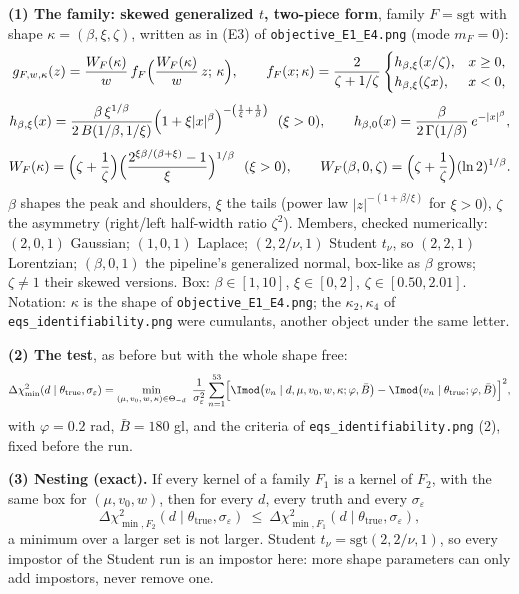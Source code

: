 \textbf{(1) The family: skewed generalized $t$, two-piece form}, family $F=\mathrm{sgt}$ with shape $\kappa=(\beta,\xi,\zeta)$, written as in (E3) of \texttt{objective\_E1\_E4.png} (mode $m_F=0$):
\begin{gather*}
g_{F,w,\kappa}(z)=\frac{W_F(\kappa)}{w}\,f_F\Bigl(\frac{W_F(\kappa)}{w}\,z;\,\kappa\Bigr),\qquad
f_F(x;\kappa)=\frac{2}{\zeta+1/\zeta}\begin{cases}h_{\beta,\xi}(x/\zeta), & x\ge0,\\ h_{\beta,\xi}(\zeta x), & x<0,\end{cases}\\[4pt]
h_{\beta,\xi}(x)=\frac{\beta\,\xi^{1/\beta}}{2\,B(1/\beta,1/\xi)}\Bigl(1+\xi\lvert x\rvert^{\beta}\Bigr)^{-\left(\frac1\xi+\frac1\beta\right)}\ \ (\xi>0),\qquad
h_{\beta,0}(x)=\frac{\beta}{2\,\Gamma(1/\beta)}\,e^{-\lvert x\rvert^{\beta}},\\[4pt]
W_F(\kappa)=\Bigl(\zeta+\frac1\zeta\Bigr)\Bigl(\frac{2^{\xi\beta/(\beta+\xi)}-1}{\xi}\Bigr)^{1/\beta}\ \ (\xi>0),\qquad
W_F(\beta,0,\zeta)=\Bigl(\zeta+\frac1\zeta\Bigr)(\ln2)^{1/\beta}.
\end{gather*}
$\beta$ shapes the peak and shoulders, $\xi$ the tails (power law $\lvert z\rvert^{-(1+\beta/\xi)}$ for $\xi>0$), $\zeta$ the asymmetry (right/left half-width ratio $\zeta^{2}$). Members, checked numerically: $(2,0,1)$ Gaussian; $(1,0,1)$ Laplace; $(2,2/\nu,1)$ Student $t_\nu$, so $(2,2,1)$ Lorentzian; $(\beta,0,1)$ the pipeline's generalized normal, box-like as $\beta$ grows; $\zeta\neq1$ their skewed versions. Box: $\beta\in[1,10]$, $\xi\in[0,2]$, $\zeta\in[0.50,2.01]$. Notation: $\kappa$ is the shape of \texttt{objective\_E1\_E4.png}; the $\kappa_2,\kappa_4$ of \texttt{eqs\_identifiability.png} were cumulants, another object under the same letter.

\medskip
\textbf{(2) The test}, as before but with the whole shape free:
\begin{equation*}
\Delta\chi^2_{\min}(d\mid\theta_{\mathrm{true}},\sigma_\varepsilon)=\min_{(\mu,\,v_0,\,w,\,\kappa)\in\Theta_{-d}}\ \frac{1}{\sigma_\varepsilon^{2}}\sum_{n=1}^{53}\Bigl[\Imod\bigl(v_n\mid d,\mu,v_0,w,\kappa;\varphi,\bar B\bigr)-\Imod\bigl(v_n\mid\theta_{\mathrm{true}};\varphi,\bar B\bigr)\Bigr]^{2},
\end{equation*}
with $\varphi=0.2$ rad, $\bar B=180$ gl, and the criteria of \texttt{eqs\_identifiability.png} (2), fixed before the run.

\medskip
\textbf{(3) Nesting (exact).} If every kernel of a family $F_1$ is a kernel of $F_2$, with the same box for $(\mu,v_0,w)$, then for every $d$, every truth and every $\sigma_\varepsilon$
\begin{equation*}
\Delta\chi^2_{\min,F_2}(d\mid\theta_{\mathrm{true}},\sigma_\varepsilon)\ \le\ \Delta\chi^2_{\min,F_1}(d\mid\theta_{\mathrm{true}},\sigma_\varepsilon),
\end{equation*}
a minimum over a larger set is not larger. Student $t_\nu=\mathrm{sgt}(2,2/\nu,1)$, so every impostor of the Student run is an impostor here: more shape parameters can only add impostors, never remove one.

